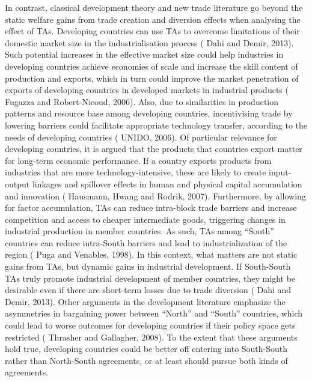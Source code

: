 In contrast, classical development theory and new trade literature go
beyond the static welfare gains from trade creation and diversion
effects when analysing the effect of TAs. Developing countries can use
TAs to overcome limitations of their domestic market size in the
industrialisation process (\cite{dahi_preferential_2013} Dahi and Demir, 2013). Such potential
increases in the effective market size could help industries in
developing countries achieve economies of scale and increase the skill
content of production and exports, which in turn could improve the
market penetration of exports of developing countries in developed
markets in industrial products (\cite{fugazza_can_2006} Fugazza and Robert-Nicoud, 2006). Also,
due to similarities in production patterns and resource base among
developing countries, incentivising trade by lowering barriers could
facilitate appropriate technology transfer, according to the needs of
developing countries (\cite{unido_industrial_2006} UNIDO, 2006). Of particular relevance for
developing countries, it is argued that the products that countries
export matter for long-term economic performance. If a country exports
products from industries that are more technology-intensive, these are
likely to create input-output linkages and spillover effects in human
and physical capital accumulation and innovation (\cite{hausmann_what_2007} Hausmann, Hwang and
Rodrik, 2007). Furthermore, by allowing for factor accumulation, TAs can
reduce intra-block trade barriers and increase competition and access to
cheaper intermediate goods, triggering changes in industrial production
in member countries. As such, TAs among ``South'' countries can reduce
intra-South barriers and lead to industrialization of the region (\cite{puga_trading_1998} Puga
and Venables, 1998). In this context, what matters are not static gains
from TAs, but dynamic gains in industrial development. If South-South
TAs truly promote industrial development of member countries, they might
be desirable even if there are short-term losses due to trade diversion
(\cite{dahi_preferential_2013} Dahi and Demir, 2013). Other arguments in the development literature
emphasize the asymmetries in bargaining power between ``North'' and
``South'' countries, which could lead to worse outcomes for developing
countries if their policy space gets restricted (\cite{thrasher_21st_2008} Thrasher and Gallagher,
2008). To the extent that these arguments hold true, developing
countries could be better off entering into South-South rather than
North-South agreements, or at least should pursue both kinds of
agreements.
